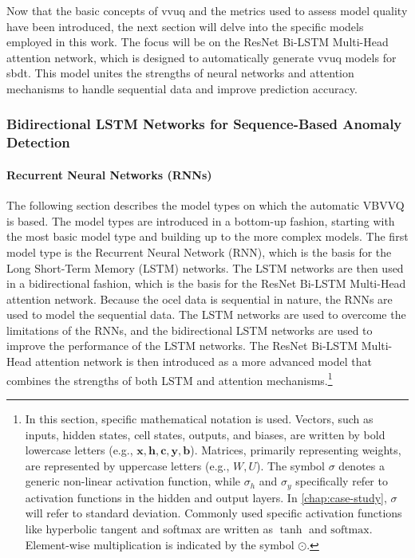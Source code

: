 Now that the basic concepts of \gls{vvuq} and the metrics used to assess model quality have been introduced, the next section will delve into the specific models employed in this work. The focus will be on the ResNet Bi-LSTM Multi-Head attention network, which is designed to automatically generate \gls{vvuq} models for \gls{sbdt}. This model unites the strengths of neural networks and attention mechanisms to handle sequential data and improve prediction accuracy.

\subsubsection*{Bidirectional LSTM Networks for Sequence-Based Anomaly Detection}

\paragraph{\textbf{Recurrent Neural Networks (RNNs)}}
\label{sec:rnn}
The following section describes the model types on which the automatic VBVVQ is based. The model types are introduced in a bottom-up fashion, starting with the most basic model type and building up to the more complex models.
The first model type is the Recurrent Neural Network (RNN), which is the basis for the Long Short-Term Memory (LSTM) networks. The LSTM networks are then used in a bidirectional fashion, which is the basis for the ResNet Bi-LSTM Multi-Head attention network. Because the \gls{ocel} data is sequential in nature, the RNNs are used to model the sequential data. The LSTM networks are used to overcome the limitations of the RNNs, and the bidirectional LSTM networks are used to improve the performance of the LSTM networks. The ResNet Bi-LSTM Multi-Head attention network is then introduced as a more advanced model that combines the strengths of both LSTM and attention mechanisms.\footnote{In this section, specific mathematical notation is used. Vectors, such as inputs, hidden states, cell states, outputs, and biases, are written by bold lowercase letters (e.g., \( \bm{x}, \bm{h}, \bm{c}, \bm{y}, \bm{b} \)). Matrices, primarily representing weights, are represented by uppercase letters (e.g., \( W, U \)). The symbol \( \sigma \) denotes a generic non-linear activation function, while \( \sigma_h \) and \( \sigma_y \) specifically refer to activation functions in the hidden and output layers. In \autoref{chap:case-study}, \( \sigma \) will refer to standard deviation. Commonly used specific activation functions like hyperbolic tangent and softmax are written as \( \tanh \) and \( \text{softmax} \). Element-wise multiplication is indicated by the symbol \( \odot \).}

